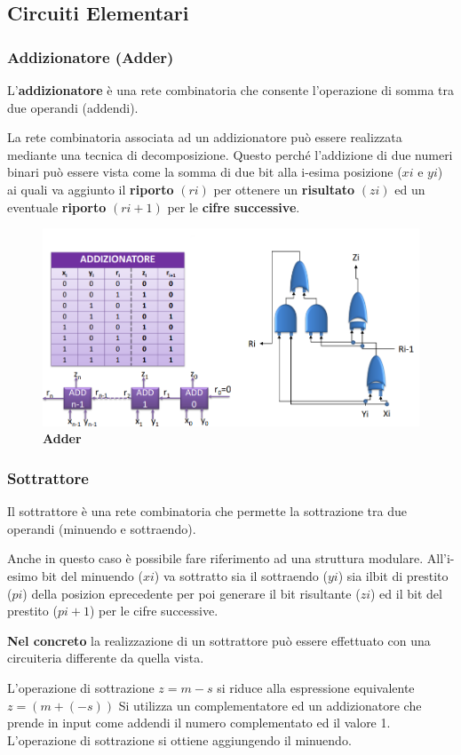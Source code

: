 \documentclass[12pt]{article} %
\begin{document}
\newpage
\subsection{Circuiti Elementari}
\subsubsection{Addizionatore (Adder)}
L’\textbf{addizionatore} è una rete combinatoria che consente l’operazione di somma tra due
operandi (addendi). \par\medskip\noindent
La rete combinatoria associata ad un addizionatore può essere realizzata mediante una tecnica di decomposizione. Questo perché l’addizione di due numeri binari può essere vista come la somma di due bit alla i-esima posizione (\(xi\) e \( yi\)) ai quali va aggiunto il \textbf{riporto} \((ri)\) per ottenere un \textbf{risultato} \((zi)\) ed un eventuale \textbf{riporto} \((ri+1)\) per le\textbf{ cifre successive}.
\begin{figure}[h]
    \centering
    \includegraphics[width=0.75\linewidth]{Addizionatore.png}
    \caption{\textbf{Adder}}
\end{figure}

\subsubsection{Sottrattore}
Il sottrattore è una rete combinatoria che permette la sottrazione tra due operandi (minuendo e sottraendo).\par\medskip\noindent
Anche in questo caso è possibile fare riferimento ad una struttura modulare.
All’i-esimo bit del minuendo (\(xi\)) va sottratto sia il sottraendo (\(yi\)) sia ilbit di prestito (\(pi\)) della posizion eprecedente per poi generare il bit risultante (\(zi\)) ed il bit del prestito (\(pi+1\)) per le cifre successive.\par\medskip\noindent
\textbf{Nel concreto} la realizzazione di un sottrattore può essere effettuato con una circuiteria differente da quella vista. \par\medskip\noindent
L’operazione di sottrazione \(z=m-s\) si riduce alla espressione equivalente \(z=(m+(-s))\)
Si utilizza un complementatore ed un addizionatore che prende in input come addendi il numero complementato ed il valore 1. L’operazione di sottrazione si ottiene aggiungendo il minuendo.
\end{document}
